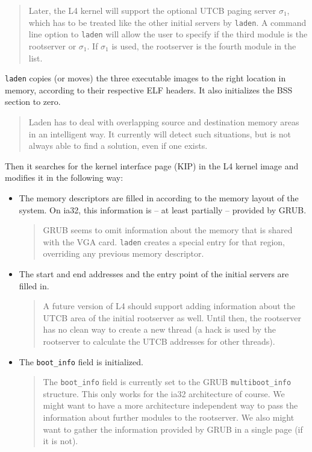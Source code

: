 \documentclass[9pt,a4paper]{extarticle}
\newenvironment{comment}{\footnotesize \begin{quote}}{\end{quote}}
\begin{document}
\begin{comment}
  Later, the L4 kernel will support the optional UTCB paging server
  $\sigma_1$, which has to be treated like the other initial servers
  by \texttt{laden}.  A command line option to \texttt{laden} will
  allow the user to specify if the third module is the rootserver or
  $\sigma_1$.  If $\sigma_1$ is used, the rootserver is the fourth
  module in the list.
\end{comment}

\texttt{laden} copies (or moves) the three executable images to the
right location in memory, according to their respective ELF headers.
It also initializes the BSS section to zero.

\begin{comment}
  Laden has to deal with overlapping source and destination memory
  areas in an intelligent way.  It currently will detect such
  situations, but is not always able to find a solution, even if one
  exists.
\end{comment}

Then it searches for the kernel interface page (KIP) in the L4 kernel
image and modifies it in the following way:

\begin{itemize}
\item The memory descriptors are filled in according to the memory
  layout of the system.  On ia32, this information is -- at least
  partially -- provided by GRUB.

  \begin{comment}
    GRUB seems to omit information about the memory that is shared
    with the VGA card.  \texttt{laden} creates a special entry for
    that region, overriding any previous memory descriptor.
  \end{comment}
  
\item The start and end addresses and the entry point of the initial
  servers are filled in.

  \begin{comment}
    A future version of L4 should support adding information about the
    UTCB area of the initial rootserver as well.  Until then, the
    rootserver has no clean way to create a new thread (a hack is used
    by the rootserver to calculate the UTCB addresses for other
    threads).
  \end{comment}

\item The \verb/boot_info/ field is initialized.

  \begin{comment}
    The \verb/boot_info/ field is currently set to the GRUB
    \verb/multiboot_info/ structure.  This only works for the ia32
    architecture of course.  We might want to have a more architecture
    independent way to pass the information about further modules to
    the rootserver.  We also might want to gather the information
    provided by GRUB in a single page (if it is not).
  \end{comment}
\end{itemize}
\end{document}

